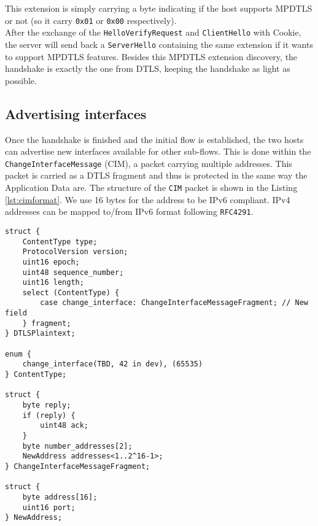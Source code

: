 This extension is simply carrying a byte indicating if the host supports MPDTLS or not (so it carry \verb!0x01! or \verb!0x00! respectively).\\

After the exchange of the \verb!HelloVerifyRequest! and \verb!ClientHello! with Cookie, the server will send back a \verb!ServerHello! containing the same extension if it wants to support MPDTLS features. Besides this MPDTLS extension discovery, the handshake is exactly the one from DTLS, keeping the handshake as light as possible.

\subsection{Advertising interfaces}

Once the handshake is finished and the initial flow is established, the two hosts can advertise new interfaces available for other sub-flows. This is done within the \verb!ChangeInterfaceMessage! (CIM), a packet carrying multiple addresses. This packet is carried as a DTLS fragment and thus is protected in the same way the Application Data are. The structure of the \verb!CIM! packet is shown in the Listing \ref{lst:cimformat}. We use 16 bytes for the address to be IPv6 compliant. IPv4 addresses can be mapped to/from IPv6 format following \verb!RFC4291!\cite{rfc4291}.  

\begin{lstlisting}[caption=Change Interface Message structure, label=lst:cimformat]
struct {
    ContentType type;
    ProtocolVersion version;
    uint16 epoch;
    uint48 sequence_number;
    uint16 length;
    select (ContentType) {
        case change_interface: ChangeInterfaceMessageFragment; // New field
    } fragment;
} DTLSPlaintext;

enum {
    change_interface(TBD, 42 in dev), (65535)
} ContentType;

struct {
    byte reply;
    if (reply) {
        uint48 ack;
    }
    byte number_addresses[2];
    NewAddress addresses<1..2^16-1>;
} ChangeInterfaceMessageFragment;

struct {
    byte address[16];
    uint16 port;
} NewAddress;
\end{lstlisting}

